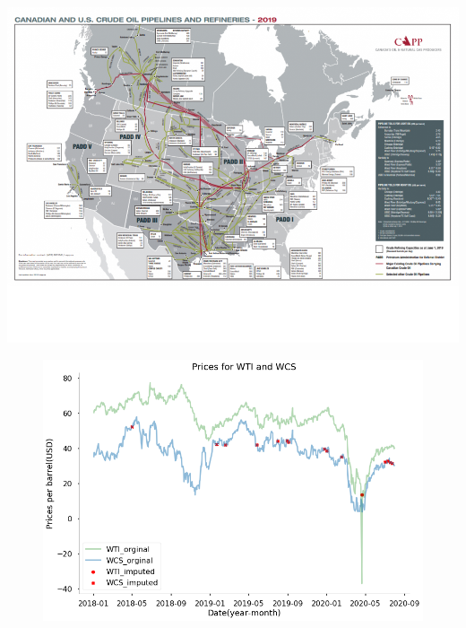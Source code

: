 \documentclass[aspectratio = 169]{beamer}
\begin{document}
\begin{frame}{}

\centering
\includegraphics[scale=0.50]{OM-images/piplines.png}

\end{frame}

\begin{frame}{}
 \begin{figure}
\includegraphics[scale = 0.40]{image.png}
\end{figure}
\end{frame}
\end{document}
